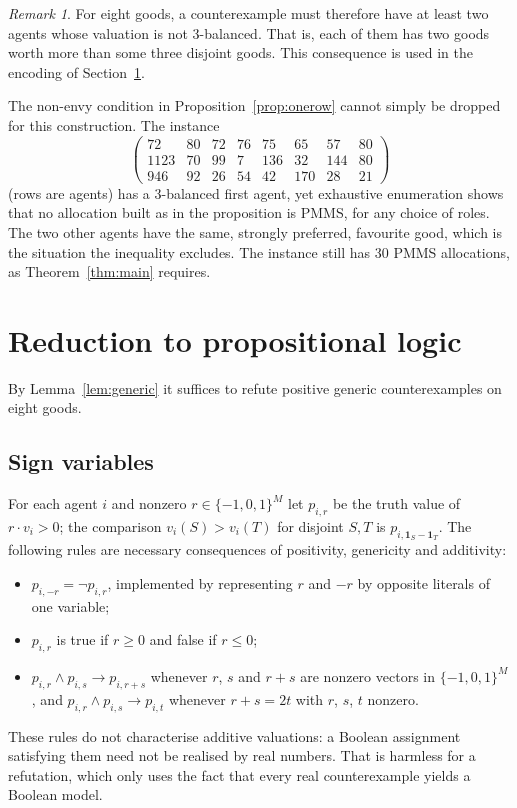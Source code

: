 \documentclass[11pt,a4paper]{article}
\theoremstyle{remark}
\newtheorem{remark}[theorem]{Remark}
\begin{document}
\begin{remark}
For eight goods, a counterexample must therefore have at least two agents whose valuation is not $3$-balanced. That is, each of them has two goods worth more than some three disjoint goods. This consequence is used in the encoding of Section~\ref{sec:reduction}.
\end{remark}

The non-envy condition in Proposition~\ref{prop:onerow} cannot simply be dropped for this construction. The instance
\[
\begin{pmatrix}
72&80&72&76&75&65&57&80\\
1123&70&99&7&136&32&144&80\\
946&92&26&54&42&170&28&21
\end{pmatrix}
\]
(rows are agents) has a $3$-balanced first agent, yet exhaustive enumeration shows that no allocation built as in the proposition is PMMS, for any choice of roles. The two other agents have the same, strongly preferred, favourite good, which is the situation the inequality excludes. The instance still has 30 PMMS allocations, as Theorem~\ref{thm:main} requires.

\section{Reduction to propositional logic}\label{sec:reduction}

By Lemma~\ref{lem:generic} it suffices to refute positive generic counterexamples on eight goods.

\subsection{Sign variables}
For each agent $i$ and nonzero $r\in\{-1,0,1\}^M$ let $p_{i,r}$ be the truth value of $r\cdot v_i>0$; the comparison $v_i(S)>v_i(T)$ for disjoint $S,T$ is $p_{i,\mathbf 1_S-\mathbf 1_T}$. The following rules are necessary consequences of positivity, genericity and additivity:
\begin{itemize}
\item $p_{i,-r}=\lnot p_{i,r}$, implemented by representing $r$ and $-r$ by opposite literals of one variable;
\item $p_{i,r}$ is true if $r\ge0$ and false if $r\le0$;
\item $p_{i,r}\wedge p_{i,s}\to p_{i,r+s}$ whenever $r$, $s$ and $r+s$ are nonzero vectors in $\{-1,0,1\}^M$, and $p_{i,r}\wedge p_{i,s}\to p_{i,t}$ whenever $r+s=2t$ with $r$, $s$, $t$ nonzero.
\end{itemize}
These rules do not characterise additive valuations: a Boolean assignment satisfying them need not be realised by real numbers. That is harmless for a refutation, which only uses the fact that every real counterexample yields a Boolean model.
\end{document}
